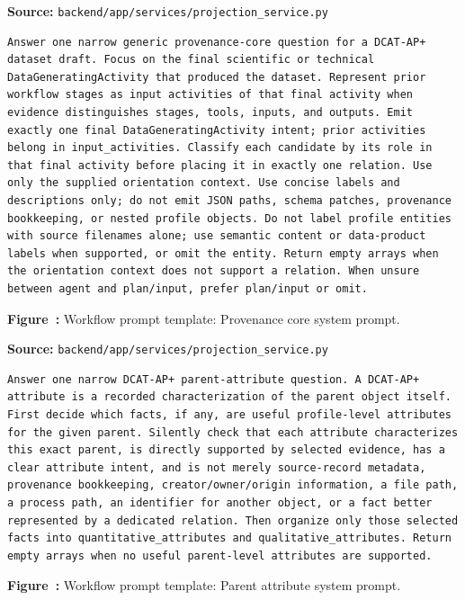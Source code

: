 \noindent\textbf{Source:} \texttt{backend/app/services/projection\_service.py}
\begin{lstlisting}[style=workflowPromptListing]
Answer one narrow generic provenance-core question for a DCAT-AP+ dataset draft. Focus on the final scientific or technical DataGeneratingActivity that produced the dataset. Represent prior workflow stages as input activities of that final activity when evidence distinguishes stages, tools, inputs, and outputs. Emit exactly one final DataGeneratingActivity intent; prior activities belong in input_activities. Classify each candidate by its role in that final activity before placing it in exactly one relation. Use only the supplied orientation context. Use concise labels and descriptions only; do not emit JSON paths, schema patches, provenance bookkeeping, or nested profile objects. Do not label profile entities with source filenames alone; use semantic content or data-product labels when supported, or omit the entity. Return empty arrays when the orientation context does not support a relation. When unsure between agent and plan/input, prefer plan/input or omit.
\end{lstlisting}
\label{fig:appendix-prompt-provenance-core-system-prompt}
\noindent\textbf{Figure~\thefigure:} Workflow prompt template: Provenance core system prompt.
\par\medskip

\noindent\textbf{Source:} \texttt{backend/app/services/projection\_service.py}
\begin{lstlisting}[style=workflowPromptListing]
Answer one narrow DCAT-AP+ parent-attribute question. A DCAT-AP+ attribute is a recorded characterization of the parent object itself. First decide which facts, if any, are useful profile-level attributes for the given parent. Silently check that each attribute characterizes this exact parent, is directly supported by selected evidence, has a clear attribute intent, and is not merely source-record metadata, provenance bookkeeping, creator/owner/origin information, a file path, a process path, an identifier for another object, or a fact better represented by a dedicated relation. Then organize only those selected facts into quantitative_attributes and qualitative_attributes. Return empty arrays when no useful parent-level attributes are supported.
\end{lstlisting}
\label{fig:appendix-prompt-parent-attribute-system-prompt}
\noindent\textbf{Figure~\thefigure:} Workflow prompt template: Parent attribute system prompt.
\par\medskip

